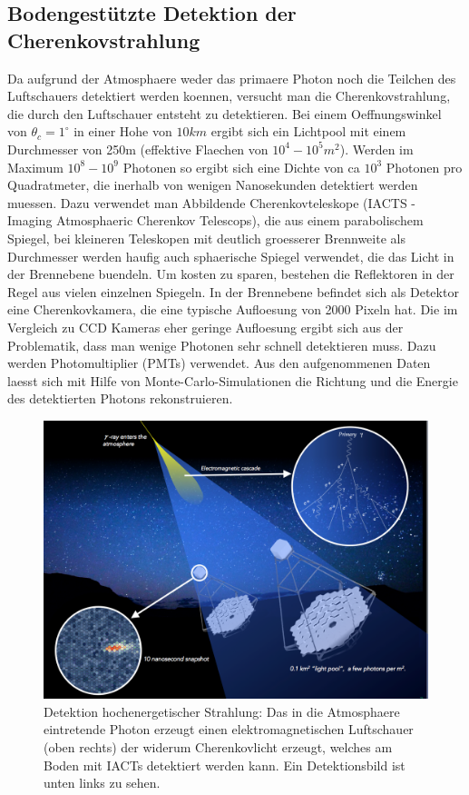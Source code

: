 \subsection{Bodengestützte Detektion der Cherenkovstrahlung}
Da aufgrund der Atmosphaere weder das primaere Photon noch die Teilchen des Luftschauers detektiert werden koennen, versucht man die Cherenkovstrahlung, die durch den Luftschauer entsteht zu detektieren. Bei einem Oeffnungswinkel von $\theta_c=1^{\circ}$%
in einer Hohe von $10km$ ergibt sich ein Lichtpool mit einem Durchmesser von 250m (effektive Flaechen von $10^4-10^5 m^2$). Werden im Maximum $10^8-10^9$ Photonen so ergibt sich eine Dichte von ca $10^3$ Photonen pro Quadratmeter, die inerhalb von wenigen Nanosekunden detektiert werden muessen.
Dazu verwendet man Abbildende Cherenkovteleskope (IACTS - Imaging Atmosphaeric Cherenkov Telescops), die aus einem parabolischem Spiegel, bei kleineren Teleskopen mit deutlich groesserer Brennweite als Durchmesser werden haufig auch sphaerische Spiegel verwendet, die das Licht in der Brennebene buendeln. Um kosten zu sparen, bestehen die Reflektoren in der Regel aus vielen einzelnen Spiegeln. In der Brennebene befindet sich als Detektor eine Cherenkovkamera, die eine typische Aufloesung von 2000 Pixeln hat. Die im Vergleich zu CCD Kameras eher geringe Aufloesung ergibt sich aus der Problematik, dass man wenige Photonen sehr schnell detektieren muss. Dazu werden Photomultiplier (PMTs) verwendet.
Aus den aufgenommenen Daten laesst sich mit Hilfe von Monte-Carlo-Simulationen die Richtung und die Energie des detektierten Photons rekonstruieren. 

\begin{figure}[htbp]
\centering
\includegraphics[width=\textwidth]{Images/detection.png}
\caption{Detektion hochenergetischer Strahlung: Das in die Atmosphaere eintretende Photon erzeugt einen elektromagnetischen Luftschauer (oben rechts) der widerum Cherenkovlicht erzeugt, welches am Boden mit IACTs detektiert werden kann. Ein Detektionsbild ist unten links zu sehen.}
\label{img:detection}
\end{figure}

